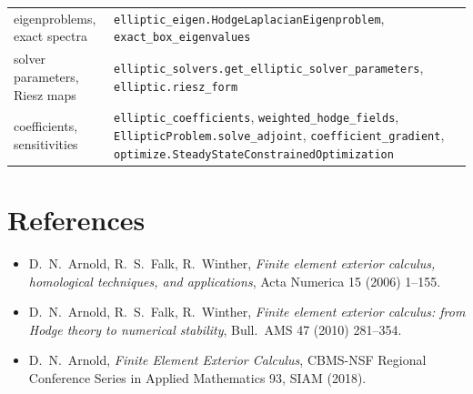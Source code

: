 \documentclass[11pt]{article}
\newcommand{\code}[1]{\texttt{#1}}
\theoremstyle{remark}
\begin{document}
\begin{center}
\begin{tabular}{@{}>{\raggedright}p{}>{\raggedright\arraybackslash}p{}@{}}
eigenproblems, exact spectra & \code{elliptic\_eigen.HodgeLaplacianEigenproblem}, \code{exact\_box\_eigenvalues}\\
solver parameters, Riesz maps & \code{elliptic\_solvers.get\_elliptic\_solver\_parameters}, \code{elliptic.riesz\_form}\\
coefficients, sensitivities & \code{elliptic\_coefficients}, \code{weighted\_hodge\_fields}, \code{EllipticProblem.solve\_adjoint}, \code{coefficient\_gradient}, \code{optimize.SteadyStateConstrainedOptimization}\\
\bottomrule
\end{tabular}
\end{center}

\section*{References}
\begin{itemize}
\item D.~N.~Arnold, R.~S.~Falk, R.~Winther, \emph{Finite element exterior calculus, homological
  techniques, and applications}, Acta Numerica 15 (2006) 1--155.
\item D.~N.~Arnold, R.~S.~Falk, R.~Winther, \emph{Finite element exterior calculus: from Hodge theory
  to numerical stability}, Bull.\ AMS 47 (2010) 281--354.
\item D.~N.~Arnold, \emph{Finite Element Exterior Calculus}, CBMS-NSF Regional Conference Series in
  Applied Mathematics 93, SIAM (2018).
\end{itemize}
\end{document}
